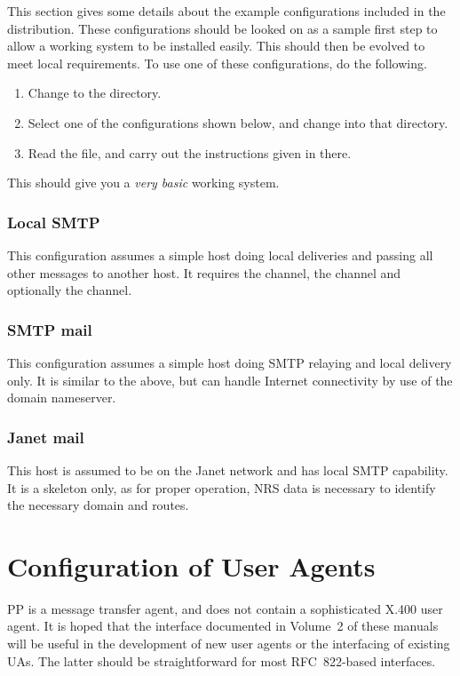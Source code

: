 This section gives some details about the example configurations
included in the distribution. These configurations should be looked on
as a sample first step to allow a working system to be installed
easily. This should then be evolved to meet local requirements.
To use one of these configurations, do the following.
\begin{enumerate}
\item Change to the  directory.
\item Select one of the configurations shown below, and change into
that directory.
\item Read the  file, and carry out the instructions
given in there.
\end{enumerate}

This should give you a {\em very basic} working system.

\subsubsection{Local SMTP}
This configuration assumes a simple host doing local deliveries and
passing all other messages to another host. It requires the 
channel, the  channel and optionally the 
channel.

\subsubsection {SMTP mail}
This configuration assumes a simple host doing SMTP relaying and local
delivery only. It is similar to the above, but can handle Internet
connectivity by use of the domain nameserver.

\subsubsection {Janet mail}
This host is assumed to be on the Janet network and has local SMTP
capability. It is a skeleton only, as for proper operation, NRS data is
necessary to identify the necessary domain and routes.

\section {Configuration of User Agents}

PP is a message transfer agent, and does not contain a sophisticated
X.400 user agent. It is hoped that the interface documented in
Volume~2 of these manuals
will be useful in the development of new user agents or the
interfacing of existing UAs. The latter should be straightforward
for most RFC~822-based interfaces.

